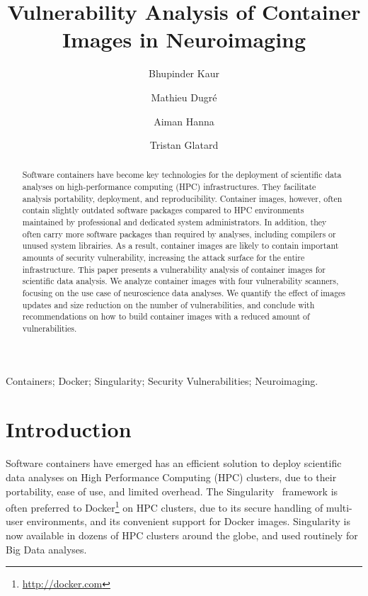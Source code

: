 \documentclass[a4paper,num-refs]{oup-contemporary}
\title{Vulnerability Analysis of Container Images in Neuroimaging}
\begin{document}
\author[1]{Bhupinder Kaur}
\author[1]{Mathieu Dugr\'e}
\author[1]{Aiman Hanna}
\author[1]{Tristan Glatard}


\maketitle

\begin{abstract}
Software containers have become key technologies for the deployment of
scientific data analyses on high-performance computing (HPC)
infrastructures. They facilitate analysis portability, deployment, and
reproducibility. Container images, however, often contain slightly outdated
software packages compared to HPC environments maintained by professional
and dedicated system administrators. In addition, they often carry more
software packages than required by analyses, including compilers or unused
system librairies. As a result, container images are likely to contain
important amounts of security vulnerability, increasing the attack surface
for the entire infrastructure. This paper presents a vulnerability analysis
of container images for scientific data analysis. We analyze container
images with four vulnerability scanners, focusing on the use case of
neuroscience data analyses. We quantify the effect of images updates and
size reduction on the number of vulnerabilities, and conclude with
recommendations on how to build container images with a reduced amount of
vulnerabilities.


\end{abstract}

\begin{keywords}
Containers; Docker; Singularity; Security Vulnerabilities; Neuroimaging.
\end{keywords}

\section{Introduction}

Software containers have emerged has an efficient solution to deploy
scientific data analyses on High Performance Computing (HPC) clusters, due
to their portability, ease of use, and limited overhead. The
Singularity~\cite{kurtzer2017singularity} framework is often preferred to
Docker\footnote{\url{http://docker.com}} on HPC clusters, due to its
secure handling of multi-user environments, and its convenient support for
Docker images. Singularity is now available in dozens of HPC
clusters around the globe, and used routinely for Big Data analyses.
\end{document}
